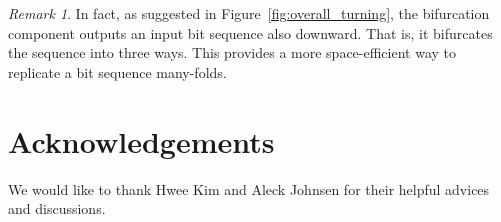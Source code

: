 \documentclass{article}
\theoremstyle{remark}
\newtheorem{remark}{Remark}
\begin{document}
\begin{remark}
In fact, as suggested in Figure~\ref{fig:overall_turning}, the bifurcation component outputs an input bit sequence also downward.
That is, it bifurcates the sequence into three ways.
This provides a more space-efficient way to replicate a bit sequence many-folds.
\end{remark}




	\section*{Acknowledgements}

We would like to thank Hwee Kim and Aleck Johnsen for their helpful advices and discussions.





	
	
\end{document}
